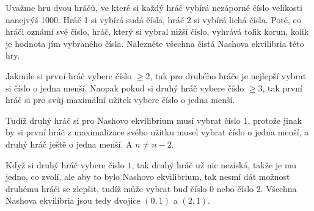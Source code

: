 \documentclass[12pt]{article}					%
\begin{document}
\begin{priklad}[1.4]
	Uvažme hru dvou hráčů, ve které si každý hráč vybírá nezáporné číslo velikosti nanejvýš 1000. Hráč 1 si vybírá sudá čísla, hráč 2 si vybírá lichá čísla. Poté, co hráči oznámí své číslo, hráč, který si vybral nižší číslo, vyhrává tolik korun, kolik je hodnota jím vybraného čísla. Nalezněte všechna čistá Nashova ekvilibria této hry.

	\begin{reseni}
		Jakmile si první hráč vybere číslo $≥ 2$, tak pro druhého hráče je nejlepší vybrat si číslo o jedna menší. Naopak pokud si druhý hráč vybere číslo $≥ 3$, tak první hráč si pro svůj maximální užitek vybere číslo o jedna menší.

		Tudíž druhý hráč si pro Nashovo ekvilibrium musí vybrat číslo $1$, protože jinak by si první hráč z maximalizace svého užitku musel vybrat číslo o jedna menší, a druhý hráč ještě o jedna menší. A $n ≠ n - 2$.

		Když si druhý hráč vybere číslo $1$, tak druhý hráč už nic nezíská, takže je mu jedno, co zvolí, ale aby to bylo Nashovo ekvilibrium, tak nesmí dát možnost druhému hráči se zlepšit, tudíž může vybrat buď číslo $0$ nebo číslo $2$. Všechna Nashova ekvilibria jsou tedy dvojice $(0, 1)$ a $(2, 1)$.
	\end{reseni}
\end{priklad}
\end{document}
